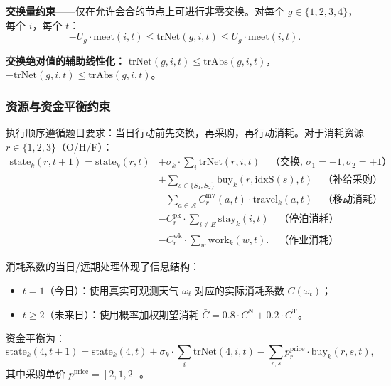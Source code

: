\textbf{交换量约束}——仅在允许会合的节点上可进行非零交换。对每个 $g\in\{1,2,3,4\}$，每个 $i$，每个 $t$：
\begin{equation}
-U_g\cdot \text{meet}(i,t) \leq \text{trNet}(g,i,t) \leq U_g\cdot \text{meet}(i,t).
\end{equation}

\textbf{交换绝对值的辅助线性化：} $\text{trNet}(g,i,t)\leq\text{trAbs}(g,i,t)$，$-\text{trNet}(g,i,t)\leq\text{trAbs}(g,i,t)$。

\subsubsection{资源与资金平衡约束}

执行顺序遵循题目要求：当日行动前先交换，再采购，再行动消耗。对于消耗资源 $r\in\{1,2,3\}$（O/H/F）：
\begin{equation}\label{eq:q4_resource_balance}
\begin{aligned}
\text{state}_k(r, t+1) = \text{state}_k(r, t)
    &+ \sigma_k \cdot \sum_i \text{trNet}(r,i,t)                                          \quad\text{（交换, $\sigma_1=-1, \sigma_2=+1$）}\\
    &+ \sum_{s\in\{S_1,S_2\}} \text{buy}_k(r,\mathrm{idxS}(s),t)                           \quad\text{（补给采购）}\\
    &- \sum_{a\in\mathcal{A}} C_r^{\mathrm{mv}}(a,t)\cdot \text{travel}_k(a,t)             \quad\text{（移动消耗）}\\
    &- C_r^{\mathrm{pk}}\cdot \sum_{i\notin E} \text{stay}_k(i,t)                           \quad\text{（停泊消耗）}\\
    &- C_r^{\mathrm{wk}}\cdot \sum_w \text{work}_k(w,t).                                   \quad\text{（作业消耗）}
\end{aligned}
\end{equation}

消耗系数的当日/远期处理体现了信息结构：
\begin{itemize}
    \item $t=1$（今日）：使用真实可观测天气 $\omega_t$ 对应的实际消耗系数 $C(\omega_t)$；
    \item $t\geq 2$（未来日）：使用概率加权期望消耗 $\bar{C}=0.8\cdot C^{\text{N}}+0.2\cdot C^{\text{T}}$。
\end{itemize}

资金平衡为：
\begin{equation}
\text{state}_k(4, t+1) = \text{state}_k(4, t) + \sigma_k\cdot\sum_i \text{trNet}(4,i,t) - \sum_{r,s} p_r^{\text{price}}\cdot \text{buy}_k(r,s,t),
\end{equation}
其中采购单价 $p^{\text{price}}=[2,1,2]$。

